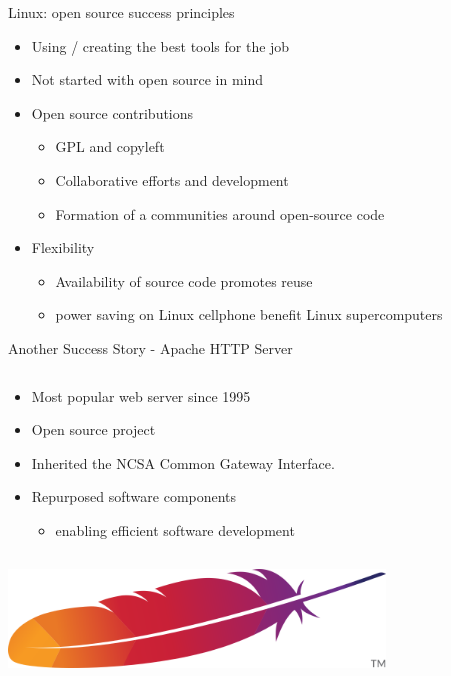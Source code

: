 


\begin{frame}{Linux: open source success principles}
  \begin{itemize}
    \item Using / creating the best tools for the job
    \item Not started with open source in mind \cite[3:30]{torvalds}
    \item Open source contributions
      \begin{itemize}
        \item GPL and copyleft
        \item Collaborative efforts and development
        \item Formation of a communities around open-source code
      \end{itemize}
    \item Flexibility
      \begin{itemize}
        \item Availability of source code promotes reuse
        \item power saving on Linux cellphone benefit Linux supercomputers~\cite[11:34]{zemlin}
      \end{itemize}
  \end{itemize}
\end{frame}



\begin{frame}{Another Success Story - Apache HTTP Server}
  \begin{column}{.5\textwidth}
    \begin{itemize}
      \item Most popular web server since 1995
      \item Open source project
      \item Inherited the NCSA Common Gateway Interface.
      \item Repurposed software components
        \begin{itemize}
          \item enabling efficient software development \cite[p. 17]{bisson}
        \end{itemize}
    \end{itemize}
  \end{column}
  \begin{column}{0.5\textwidth}\raggedleft
    \includegraphics[width = 0.75\textwidth]{apache.png}
  \end{column}
\end{frame}

